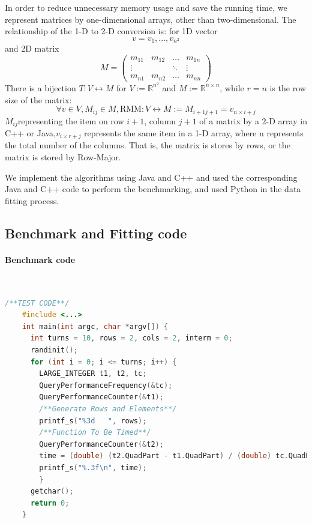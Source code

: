 \documentclass[UTF8]{ctexart}
\begin{document}
In order to reduce unnecessary memory usage and save the running time,
we represent matrices by one-dimensional arrays, other than
two-dimensional. The relationship of the 1-D to 2-D conversion is: for 1D vector
\begin{equation}
  v={v_{1},\dots,v_{n^{2}}}
\end{equation}
and 2D matrix
\begin{equation}
  M=\left(
  \begin{matrix}
    m_{11} & m_{12} & \dots  & m_{1n} \\
    \vdots &        & \ddots & \vdots \\
    m_{n1} & m_{n2} & \dots  & m_{nn}
  \end{matrix}
  \right)
\end{equation}
There is a bijection \(T:V\leftrightarrow M\) for \(V:=\mathbb{R}^{n^{2}}\) and \(M:=\mathbb{R}^{n\times n}\), while \(r=n\) is the row size of the matrix:
\begin{equation}
  \forall v\in V,M_{ij}\in M,\mathrm{RMM}:V\leftrightarrow M:=M_{i+1j+1}=v_{n\times i+j}
\end{equation}
\(M_{ij}\)representing the item on row \(i+1\), column \(j+1\) of a
matrix by a 2-D array in C++ or Java,\(v_{i\times r+j}\) represents the same item in a 1-D
array, where n represents the total number of the columns. That is, the
matrix is stores by rows, or the matrix is stored by Row-Major.

We implement the algorithms using Java and C++ and used the corresponding Java and C++ code
to perform the benchmarking, and used Python in the data fitting process.

\subsection{Benchmark and Fitting code}
\label{subsec::BFC}

\paragraph{Benchmark code}~{}\\
\begin{lstlisting}[language=C++,style=C++]
  /**TEST CODE**/
    #include <...>
    int main(int argc, char *argv[]) {
      int turns = 10, rows = 2, cols = 2, interm = 0;
      randinit();
      for (int i = 0; i <= turns; i++) {
        LARGE_INTEGER t1, t2, tc;
        QueryPerformanceFrequency(&tc);
        QueryPerformanceCounter(&t1);
        /**Generate Rows and Elements**/
        printf_s("%3d   ", rows);
        /**Function To Be Timed**/
        QueryPerformanceCounter(&t2);
        time = (double) (t2.QuadPart - t1.QuadPart) / (double) tc.QuadPart;
        printf_s("%.3f\n", time);
        }
      getchar();
      return 0;
    }
\end{lstlisting}
\pagebreak
\end{document}
